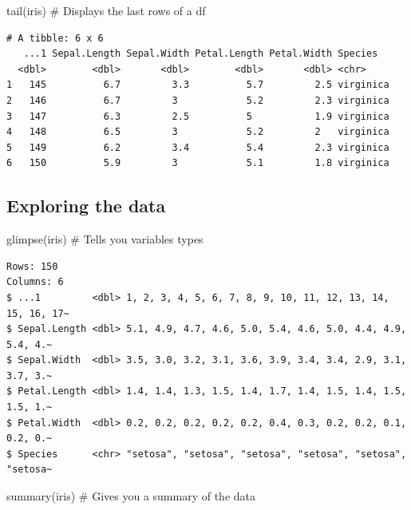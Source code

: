 \documentclass[
  letterpaper,
  DIV=11,
  numbers=noendperiod,
  oneside]{scrartcl}
\newenvironment{Shaded}{\begin{snugshade}}{\end{snugshade}}
\newcommand{\CommentTok}[1]{\textcolor[rgb]{0.37,0.37,0.37}{#1}}
\newcommand{\FunctionTok}[1]{\textcolor[rgb]{0.28,0.35,0.67}{#1}}
\newcommand{\NormalTok}[1]{\textcolor[rgb]{0.00,0.23,0.31}{#1}}
\begin{document}
\begin{Shaded}
\begin{Highlighting}[]
\FunctionTok{tail}\NormalTok{(iris)  }\CommentTok{\# Displays the last rows of a df}
\end{Highlighting}
\end{Shaded}

\begin{verbatim}
# A tibble: 6 x 6
   ...1 Sepal.Length Sepal.Width Petal.Length Petal.Width Species  
  <dbl>        <dbl>       <dbl>        <dbl>       <dbl> <chr>    
1   145          6.7         3.3          5.7         2.5 virginica
2   146          6.7         3            5.2         2.3 virginica
3   147          6.3         2.5          5           1.9 virginica
4   148          6.5         3            5.2         2   virginica
5   149          6.2         3.4          5.4         2.3 virginica
6   150          5.9         3            5.1         1.8 virginica
\end{verbatim}

\subsection{Exploring the data}\label{exploring-the-data-1}

\begin{Shaded}
\begin{Highlighting}[]
\FunctionTok{glimpse}\NormalTok{(iris) }\CommentTok{\# Tells you variables types }
\end{Highlighting}
\end{Shaded}

\begin{verbatim}
Rows: 150
Columns: 6
$ ...1         <dbl> 1, 2, 3, 4, 5, 6, 7, 8, 9, 10, 11, 12, 13, 14, 15, 16, 17~
$ Sepal.Length <dbl> 5.1, 4.9, 4.7, 4.6, 5.0, 5.4, 4.6, 5.0, 4.4, 4.9, 5.4, 4.~
$ Sepal.Width  <dbl> 3.5, 3.0, 3.2, 3.1, 3.6, 3.9, 3.4, 3.4, 2.9, 3.1, 3.7, 3.~
$ Petal.Length <dbl> 1.4, 1.4, 1.3, 1.5, 1.4, 1.7, 1.4, 1.5, 1.4, 1.5, 1.5, 1.~
$ Petal.Width  <dbl> 0.2, 0.2, 0.2, 0.2, 0.2, 0.4, 0.3, 0.2, 0.2, 0.1, 0.2, 0.~
$ Species      <chr> "setosa", "setosa", "setosa", "setosa", "setosa", "setosa~
\end{verbatim}

\begin{Shaded}
\begin{Highlighting}[]
\FunctionTok{summary}\NormalTok{(iris) }\CommentTok{\# Gives you a summary of the data}
\end{Highlighting}
\end{Shaded}
\end{document}
